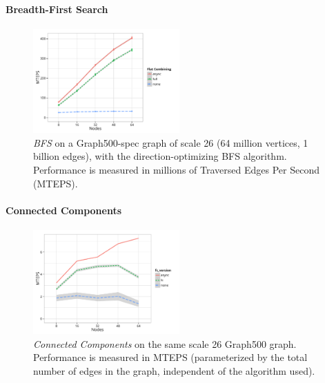 \paragraph{Breadth-First Search}
\begin{figure}[t]
  \centering
  \includegraphics[width=0.5\textwidth]{data/plots/bfs_perf.pdf}
  \caption{\emph{BFS} on a Graph500-spec graph of scale 26 (64 million vertices, 1 billion edges), with the direction-optimizing BFS algorithm. Performance is measured in millions of Traversed Edges Per Second (MTEPS).}
  \label{fig:bfs_perf}
\end{figure}


\paragraph{Connected Components}

\begin{figure}[t]
  \centering
  \includegraphics[width=0.5\textwidth]{data/plots/cc_perf.pdf}
  \caption{\emph{Connected Components} on the same scale 26 Graph500 graph. Performance is measured in MTEPS (parameterized by the total number of edges in the graph, independent of the algorithm used).}
  \label{fig:cc_perf}
\end{figure}

